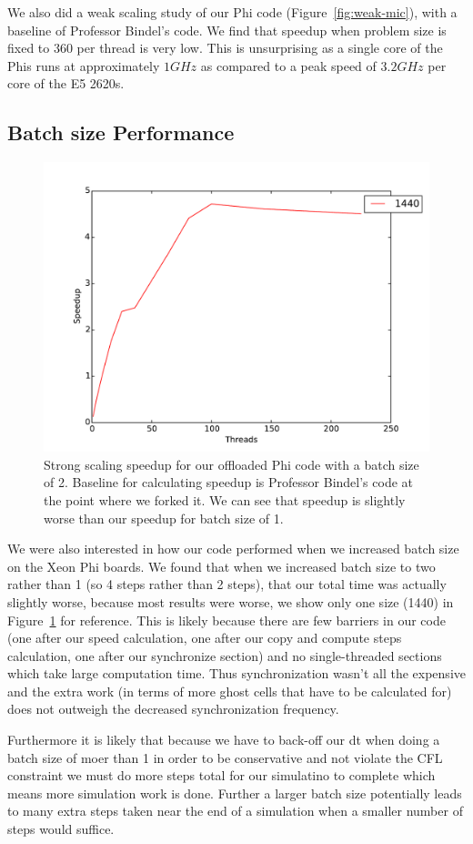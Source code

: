We also did a weak scaling study of our Phi code (Figure~\ref{fig:weak-mic}), with a baseline of Professor Bindel's code. We find that speedup when problem size is fixed to 360 per thread is very low. This is unsurprising as a single core of the Phis runs at approximately $1GHz$ as compared to a peak speed of $3.2GHz$ per core of the E5 2620s.

\subsection{Batch size Performance}

\begin{figure}[h!]
\centering
\includegraphics[width=0.5\linewidth]{mic_strong_bindel_baseline_batchsize2.pdf}
\caption{Strong scaling speedup for our offloaded Phi code with a batch size of 2. Baseline for calculating speedup is Professor Bindel's code at the point where we forked it. We can see that speedup is slightly worse than our speedup for batch size of 1.}
\label{fig:batch2}
\end{figure}

We were also interested in how our code performed when we increased batch size on the Xeon Phi boards. We found that when we increased batch size to two rather than 1 (so 4 steps rather than 2 steps), that our total time was actually slightly worse, because most results were worse, we show only one size (1440) in Figure~\ref{fig:batch2} for reference. This is likely because there are few barriers in our code (one after our speed calculation, one after our copy and compute steps calculation, one after our synchronize section) and no single-threaded sections which take large computation time. Thus synchronization wasn't all the expensive and the extra work (in terms of more ghost cells that have to be calculated for) does not outweigh the decreased synchronization frequency.

Furthermore it is likely that because we have to back-off our dt when doing a batch size of moer than 1 in order to be conservative and not violate the CFL constraint we must do more steps total for our simulatino to complete which means more simulation work is done. Further a larger batch size potentially leads to many extra steps taken near the end of a simulation when a smaller number of steps would suffice.
